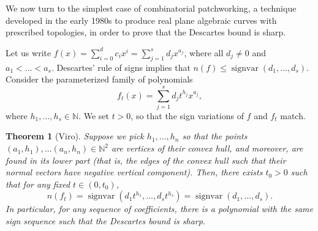 \documentclass[11pt, a4paper]{article}
\newcommand{\NN}{\mathbb{N}}
\DeclareMathOperator{\sv}{signvar}
\theoremstyle{plain}
\newtheorem{thm}[prop]{Theorem}
\theoremstyle{definition}
\begin{document}
We now turn to the simplest case of combinatorial patchworking, a technique developed in the early 1980s to produce real plane algebraic curves with prescribed topologies, in order to prove that the Descartes bound is sharp.

Let us write $f(x)=\sum_{i=0}^d c_ix^i=\sum_{j=1}^s d_j x^{a_j}$, where all $d_j\neq 0$ and $a_1<\dots<a_s$. Descartes' rule of signs implies that $n(f)\leq \sv(d_1,\dots,d_s)$. Consider the parameterized family of polynomials
\[f_t(x)=\sum_{j=1}^s d_j t^{h_j} x^{a_j},\]
where $h_1,\dots, h_s\in \NN$. We set $t>0$, so that the sign variations of $f$ and $f_t$ match.
\begin{thm}[Viro] Suppose we pick $h_1,\dots,h_n$ so that the points $(a_1,h_1),\dots(a_n,h_n)\in\NN^2$ are vertices of their convex hull, and moreover, are found in its \emph{lower part} (that is, the edges of the convex hull such that their normal vectors have negative vertical component). Then, there exists $t_0>0$ such that for any fixed $t\in (0,t_0)$,
\[n(f_t)=\sv(d_1t^{h_1},\dots,d_st^{h_s})=\sv(d_1,\dots, d_s).\]
In particular, for any sequence of coefficients, there is a polynomial with the same sign sequence such that the Descartes bound is sharp.
\end{thm}
\end{document}
